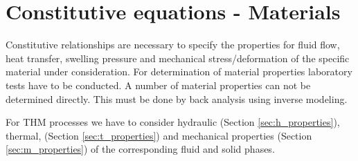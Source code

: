 \section{Constitutive equations - Materials}
\label{sec:constitutive_equations_materials}

Constitutive relationships are necessary to specify the properties for fluid flow, heat transfer, swelling pressure and mechanical stress/deformation of the specific material under consideration. For determination of material properties laboratory tests have to be conducted. A number of material properties can not be determined directly.
This must be done by back analysis using inverse modeling.

For THM processes we have to consider 
hydraulic
(Section \ref{sec:h_properties}),
thermal,
(Section \ref{sec:t_properties})
and
mechanical properties
(Section \ref{sec:m_properties})
of the corresponding fluid and solid phases.




